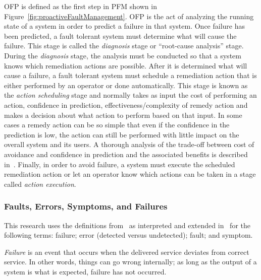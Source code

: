 \figproactiveFaultManagement{6in}

OFP is defined as the first step in PFM shown in
Figure~\ref{fig:proactiveFaultManagement}.  OFP is the act of analyzing the
running state of a system in order to predict a failure in that system. Once
failure has been predicted, a fault tolerant system must determine what will
cause the failure.  This stage is called the \emph{diagnosis} stage or
``root-cause analysis'' stage.  During the \emph{diagnosis} stage, the analysis
must be conducted so that a system knows which remediation actions are
possible.  After it is determined what will cause a failure, a fault tolerant
system must schedule a remediation action that is either performed by an
operator or done automatically.  This stage is known as the \emph{action
scheduling} stage and normally takes as input the cost of performing an action,
confidence in prediction, effectiveness/complexity of remedy action and makes a
decision about what action to perform based on that input.  In some cases a
remedy action can be so simple that even if the confidence in the prediction is
low, the action can still be performed with little impact on the overall system
and its users.  A thorough analysis of the trade-off between cost of avoidance
and confidence in prediction and the associated benefits is described
in~\cite{candea2004microreboot}.  Finally, in order to avoid failure, a system
must execute the scheduled remediation action or let an operator know which
actions can be taken in a stage called \emph{action execution}.

\subsubsection{Faults, Errors, Symptoms, and Failures}
This research uses the definitions from~\cite{avivzienis2004basic} as
interpreted and extended in~\cite{salfnerSurvey} for the following terms:
failure; error (detected versus undetected); fault; and symptom.

\emph{Failure} is an event that occurs when the delivered service deviates from
correct service.  In other words, things can go wrong internally; as long as
the output of a system is what is expected, failure has not occurred.  

